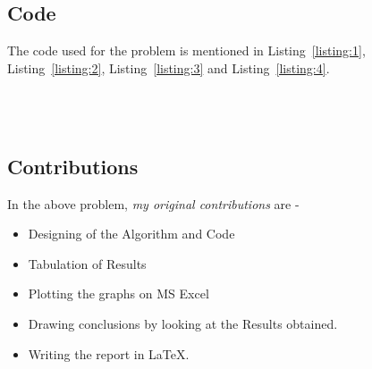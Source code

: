 \documentclass[titlepage, 11pt]{article}
\begin{document}

\subsection{Code}
The code used for the problem is mentioned in Listing~\ref{listing:1}, Listing~\ref{listing:2}, Listing~\ref{listing:3} and Listing~\ref{listing:4}. 

\inputminted[breaklines,
 mathescape,
 linenos,
 numbersep=5pt,
 frame=single,
 numbersep=5pt,
 xleftmargin=0pt]{c}{Euler.c}
\label{listing:1}

\inputminted[breaklines,
 mathescape,
 linenos,
 numbersep=5pt,
 frame=single,
 numbersep=5pt,
 xleftmargin=0pt]{c}{Heun.c}
\label{listing:2}

\inputminted[breaklines,
 mathescape,
 linenos,
 numbersep=5pt,
 frame=single,
 numbersep=5pt,
 xleftmargin=0pt]{c}{Midpoint.c}
\label{listing:3}

\inputminted[breaklines,
 mathescape,
 linenos,
 numbersep=5pt,
 frame=single,
 numbersep=5pt,
 xleftmargin=0pt]{c}{Rungekutta.c}
\label{listing:4}



\subsection{Contributions}
In the above problem, \textit{my original contributions} are - 
\begin{itemize}
    \item Designing of the Algorithm and Code
    \item Tabulation of Results
    \item Plotting the graphs on MS Excel
    \item Drawing conclusions by looking at the Results obtained.
    \item Writing the report in LaTeX. 
\end{itemize}

\end{document}

